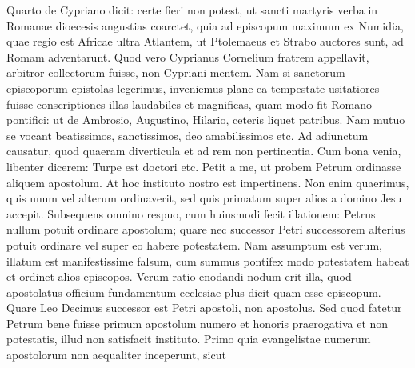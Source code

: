 Quarto de Cypriano dicit: certe fieri non potest, ut sancti martyris verba in Romanae dioecesis angustias coarctet, quia ad episcopum maximum ex Numidia, quae regio est Africae ultra Atlantem, ut Ptolemaeus et Strabo auctores sunt, ad Romam adventarunt. Quod vero Cyprianus Cornelium fratrem appellavit, arbitror collectorum fuisse, non Cypriani mentem. Nam si sanctorum episcoporum epistolas legerimus, inveniemus plane ea tempestate usitatiores fuisse conscriptiones illas laudabiles et magnificas, quam modo fit Romano pontifici: ut de Ambrosio, Augustino, Hilario, ceteris liquet patribus. Nam mutuo se vocant beatissimos, sanctissimos, deo amabilissimos etc. Ad adiunctum causatur, quod quaeram diverticula et ad rem non pertinentia. Cum bona venia, libenter dicerem: Turpe est doctori etc. Petit a me, ut probem Petrum ordinasse aliquem apostolum. At hoc instituto nostro est impertinens. Non enim quaerimus, quis unum vel alterum ordinaverit, sed quis primatum super alios a domino Jesu accepit. Subsequens omnino respuo, cum huiusmodi fecit illationem: Petrus nullum potuit ordinare apostolum; quare nec successor Petri successorem alterius potuit ordinare vel super eo habere potestatem. Nam assumptum est verum, illatum est manifestissime falsum, cum summus pontifex modo potestatem habeat et ordinet alios episcopos. Verum ratio enodandi nodum erit illa, quod apostolatus officium fundamentum ecclesiae plus dicit quam esse episcopum. Quare Leo Decimus successor est Petri apostoli, non apostolus. Sed quod fatetur Petrum bene fuisse primum apostolum numero et honoris praerogativa et non potestatis, illud non satisfacit instituto. Primo quia evangelistae numerum apostolorum non aequaliter inceperunt, sicut


